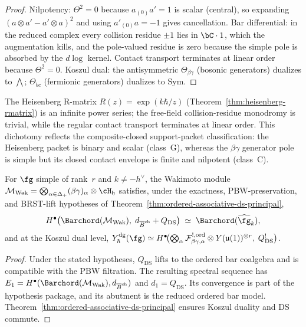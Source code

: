 \begin{proof}
Nilpotency: $\Theta^2 = 0$ because
$a_{(0)}a' = 1$ is scalar (central), so expanding
$(a\otimes a' - a'\otimes a)^2$ and using $a'_{(0)}a = -1$
gives cancellation. Bar differential: in the reduced complex
every collision residue $\pm 1$ lies in $\bC\cdot 1$,
which the augmentation kills, and the pole-valued residue is zero
because the simple pole is absorbed by the $d\log$ kernel. Contact
transport terminates at linear order because $\Theta^2=0$. Koszul dual:
the antisymmetric
$\Theta_{\beta\gamma}$ (bosonic generators) dualizes to
$\bigwedge$; $\Theta_{bc}$ (fermionic generators) dualizes
to $\mathrm{Sym}$.
\end{proof}

\begin{remark}
\label{rem:bg-vs-heisenberg}
The Heisenberg R-matrix $R(z) = \exp(k\hbar/z)$
(Theorem~\ref{thm:heisenberg-rmatrix}) is an infinite power
series; the free-field collision-residue monodromy is trivial, while
the regular contact transport terminates at linear order. This dichotomy
reflects the composite-closed support-packet classification: the
Heisenberg packet is binary and scalar (class~G), whereas the
$\beta\gamma$ generator pole is simple but its closed contact envelope
is finite and nilpotent (class~C).
\end{remark}

\begin{theorem}
\label{thm:wakimoto-ordered-bar}
For $\fg$ simple of rank~$r$ and $k \neq -h^\vee$, the
Wakimoto module
$\mathcal{M}_{\mathrm{Wak}}
= \bigotimes_{\alpha\in\Delta_+}(\beta\gamma)_\alpha
\otimes \cH_{\mathfrak{h}}$
satisfies, under the exactness, PBW-preservation, and BRST-lift
hypotheses of Theorem~\ref{thm:ordered-associative-ds-principal},
\begin{equation}\label{eq:wakimoto-ordered-bar-descent}
H^\bullet\bigl(
 \Barchord(\mathcal{M}_{\mathrm{Wak}}),\;
 d_{\Barch} + Q_{\mathrm{DS}}\bigr)
\;\simeq\; \Barchord(\widehat{\fg}_k),
\end{equation}
and at the Koszul dual level,
$Y^{\mathrm{dg}}_\hbar(\fg)
\simeq H^\bullet\!\bigl(
 \bigotimes_\alpha
 \mathcal{F}_{\beta\gamma,\alpha}^{!,\mathrm{ord}}
 \otimes Y(\mathfrak{u}(1))^{\otimes r},\;
 Q_{\mathrm{DS}}^!\bigr)$.
\end{theorem}

\begin{proof}
Under the stated hypotheses, $Q_{\mathrm{DS}}$ lifts to the ordered bar
coalgebra and is compatible with the PBW filtration. The resulting
spectral sequence has
$E_1=H^\bullet(\Barchord(\mathcal{M}_{\mathrm{Wak}}),d_{\Barch})$ and
$d_1=Q_{\mathrm{DS}}$. Its convergence is part of the hypothesis
package, and its abutment is the reduced ordered bar model.
Theorem~\ref{thm:ordered-associative-ds-principal}
ensures Koszul duality and DS commute.
\end{proof}

